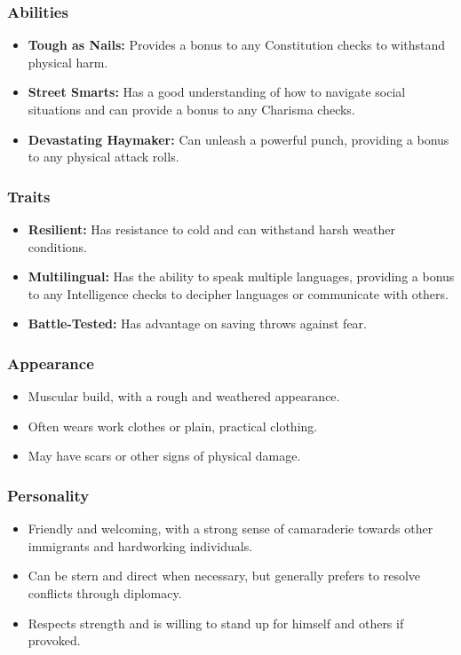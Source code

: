 \documentclass{book}
\begin{document}
\subsubsection{Abilities}
\begin{itemize}
    \item \textbf{Tough as Nails:} Provides a bonus to any Constitution checks to withstand physical harm.
    \item \textbf{Street Smarts:} Has a good understanding of how to navigate social situations and can provide a bonus to any Charisma checks.
    \item \textbf{Devastating Haymaker:} Can unleash a powerful punch, providing a bonus to any physical attack rolls.
\end{itemize}
\subsubsection{Traits}
\begin{itemize}
    \item \textbf{Resilient:} Has resistance to cold and can withstand harsh weather conditions.
    \item \textbf{Multilingual:} Has the ability to speak multiple languages, providing a bonus to any Intelligence checks to decipher languages or communicate with others.
    \item \textbf{Battle-Tested:} Has advantage on saving throws against fear.
\end{itemize}
\subsubsection{Appearance}
\begin{itemize}
    \item Muscular build, with a rough and weathered appearance.
    \item Often wears work clothes or plain, practical clothing.
    \item May have scars or other signs of physical damage.
\end{itemize}
\subsubsection{Personality}
\begin{itemize}
    \item Friendly and welcoming, with a strong sense of camaraderie towards other immigrants and hardworking individuals.
    \item Can be stern and direct when necessary, but generally prefers to resolve conflicts through diplomacy.
    \item Respects strength and is willing to stand up for himself and others if provoked.
\end{itemize}
\end{document}
